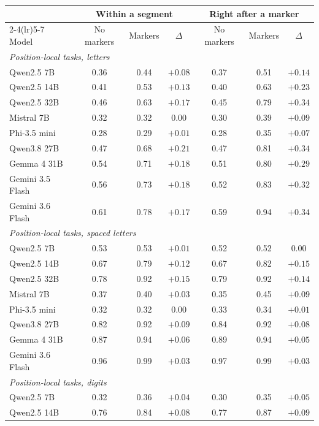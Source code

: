 \begin{tabular}{lcccccc}
\toprule
& \multicolumn{3}{c}{Within a segment} & \multicolumn{3}{c}{Right after a marker} \\
\cmidrule(lr){2-4}\cmidrule(lr){5-7}
Model & No markers & Markers & $\Delta$ & No markers & Markers & $\Delta$ \\
\midrule
\multicolumn{7}{l}{\emph{Position-local tasks, letters}} \\
Qwen2.5 7B & 0.36 & 0.44 & $+0.08$ & 0.37 & 0.51 & $+0.14$ \\
Qwen2.5 14B & 0.41 & 0.53 & $+0.13$ & 0.40 & 0.63 & $\mathbf{+0.23}$ \\
Qwen2.5 32B & 0.46 & 0.63 & $+0.17$ & 0.45 & 0.79 & $\mathbf{+0.34}$ \\
Mistral 7B & 0.32 & 0.32 & $0.00$ & 0.30 & 0.39 & $+0.09$ \\
Phi-3.5 mini & 0.28 & 0.29 & $+0.01$ & 0.28 & 0.35 & $+0.07$ \\
Qwen3.8 27B & 0.47 & 0.68 & $+0.21$ & 0.47 & 0.81 & $\mathbf{+0.34}$ \\
Gemma 4 31B & 0.54 & 0.71 & $+0.18$ & 0.51 & 0.80 & $\mathbf{+0.29}$ \\
Gemini 3.5 Flash & 0.56 & 0.73 & $+0.18$ & 0.52 & 0.83 & $\mathbf{+0.32}$ \\
Gemini 3.6 Flash & 0.61 & 0.78 & $+0.17$ & 0.59 & 0.94 & $\mathbf{+0.34}$ \\
\multicolumn{7}{l}{\emph{Position-local tasks, spaced letters}} \\
Qwen2.5 7B & 0.53 & 0.53 & $+0.01$ & 0.52 & 0.52 & $0.00$ \\
Qwen2.5 14B & 0.67 & 0.79 & $+0.12$ & 0.67 & 0.82 & $+0.15$ \\
Qwen2.5 32B & 0.78 & 0.92 & $+0.15$ & 0.79 & 0.92 & $+0.14$ \\
Mistral 7B & 0.37 & 0.40 & $+0.03$ & 0.35 & 0.45 & $+0.09$ \\
Phi-3.5 mini & 0.32 & 0.32 & $0.00$ & 0.33 & 0.34 & $+0.01$ \\
Qwen3.8 27B & 0.82 & 0.92 & $+0.09$ & 0.84 & 0.92 & $+0.08$ \\
Gemma 4 31B & 0.87 & 0.94 & $+0.06$ & 0.89 & 0.94 & $+0.05$ \\
Gemini 3.6 Flash & 0.96 & 0.99 & $+0.03$ & 0.97 & 0.99 & $+0.03$ \\
\multicolumn{7}{l}{\emph{Position-local tasks, digits}} \\
Qwen2.5 7B & 0.32 & 0.36 & $+0.04$ & 0.30 & 0.35 & $+0.05$ \\
Qwen2.5 14B & 0.76 & 0.84 & $+0.08$ & 0.77 & 0.87 & $+0.09$ \\

\end{tabular}
